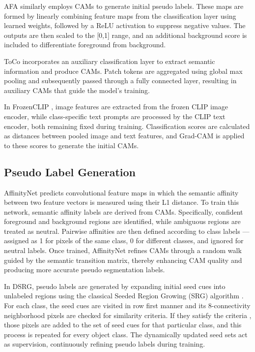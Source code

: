 AFA \cite{wsss_afa_affinity_from_attention} similarly employs CAMs to generate initial pseudo labels. These maps are formed by linearly combining feature maps from the classification layer using learned weights, followed by a ReLU activation to suppress negative values. The outputs are then scaled to the [0,1] range, and an additional background score is included to differentiate foreground from background.

ToCo \cite{wsss_toco_token_contrast} incorporates an auxiliary classification layer to extract semantic information and produce CAMs. Patch tokens are aggregated using global max pooling and subsequently passed through a fully connected layer, resulting in auxiliary CAMs that guide the model’s training.

In FrozenCLIP \cite{wsss_frozen_clip}, image features are extracted from the frozen CLIP image encoder, while class-specific text prompts are processed by the CLIP text encoder, both remaining fixed during training. Classification scores are calculated as distances between pooled image and text features, and Grad-CAM \cite{cam_grad} is applied to these scores to generate the initial CAMs.


\subsection{Pseudo Label Generation}
\label{subsec:pseudo-label-generation}
AffinityNet predicts convolutional feature maps in which the semantic affinity between two feature vectors is measured using their L1 distance. To train this network, semantic affinity labels are derived from CAMs. Specifically, confident foreground and background regions are identified, while ambiguous regions are treated as neutral. Pairwise affinities are then defined according to class labels — assigned as 1 for pixels of the same class, 0 for different classes, and ignored for neutral labels. Once trained, AffinityNet refines CAMs through a random walk guided by the semantic transition matrix, thereby enhancing CAM quality and producing more accurate pseudo segmentation labels.

In DSRG, pseudo labels are generated by expanding initial seed cues into unlabeled regions using the classical Seeded Region Growing (SRG) algorithm \cite{srg}. For each class, the seed cues are visited in row first manner and its 8-connectivity neighborhood pixels are checked for similarity criteria. If they satisfy the criteria , those pixels are added to the set of seed cues for that particular class, and this process is repeated for every object class. The dynamically updated seed sets act as supervision, continuously refining pseudo labels during training.


